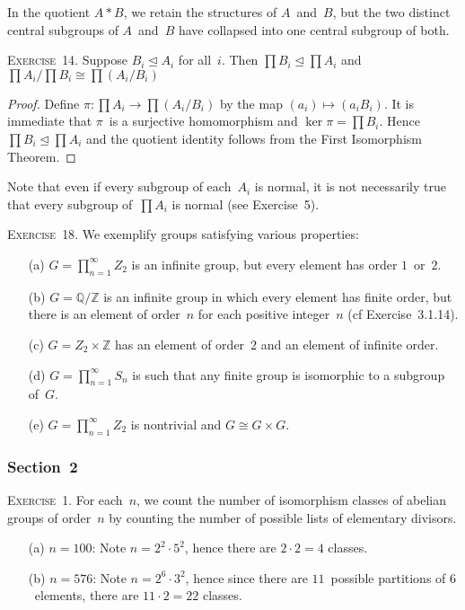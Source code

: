 \documentclass[letterpaper]{article}
\newcommand{\exercise}[1]{\goodbreak\noindent\textsc{Exercise~{#1}.}}
\newcommand{\Z}{\mathbb{Z}}
\newcommand{\Q}{\mathbb{Q}}
\newcommand{\iso}{\cong}
\newcommand{\normal}{\trianglelefteq}
\begin{document}
In the quotient $A*B$, we retain the structures of $A$~and~$B$, but the two distinct central subgroups of $A$~and~$B$ have collapsed into one central subgroup of both.

\bigskip
\exercise{14}
Suppose $B_i\normal A_i$ for all~$i$. Then $\prod B_i\normal\prod A_i$ and $\prod A_i/\prod B_i\iso\prod(A_i/B_i)$
\begin{proof}
Define $\pi:\prod A_i\to\prod(A_i/B_i)$ by the map $(a_i)\mapsto (a_iB_i)$. It is immediate that $\pi$~is a surjective homomorphism and $\ker\pi=\prod B_i$. Hence $\prod B_i\normal\prod A_i$ and the quotient identity follows from the First Isomorphism Theorem.
\end{proof}
\noindent Note that even if every subgroup of each~$A_i$ is normal, it is not necessarily true that every subgroup of~$\prod A_i$ is normal (see Exercise~5).

\bigskip
\exercise{18}
We exemplify groups satisfying various properties:
\begin{enumerate}[itemsep=0pt]
\item[(a)] $G=\prod_{n=1}^{\infty} Z_2$ is an infinite group, but every element has order $1$~or~$2$.
\item[(b)] $G=\Q/\Z$ is an infinite group in which every element has finite order, but there is an element of order~$n$ for each positive integer~$n$ (cf Exercise~3.1.14).
\item[(c)] $G=Z_2\times\Z$ has an element of order~$2$ and an element of infinite order.
\item[(d)] $G=\prod_{n=1}^{\infty} S_n$ is such that any finite group is isomorphic to a subgroup of~$G$.
\item[(e)] $G=\prod_{n=1}^{\infty} Z_2$ is nontrivial and $G\iso G\times G$.
\end{enumerate}

\subsubsection*{Section~2}
\exercise{1}
For each~$n$, we count the number of isomorphism classes of abelian groups of order~$n$ by counting the number of possible lists of elementary divisors.
\begin{enumerate}[itemsep=0pt]
\item[(a)] $n=100$: Note $n=2^2\cdot 5^2$, hence there are $2\cdot 2=4$ classes.
\item[(b)] $n=576$: Note $n=2^6\cdot 3^2$, hence since there are $11$~possible partitions of $6$~elements, there are $11\cdot 2=22$ classes.
\end{enumerate}
\end{document}
